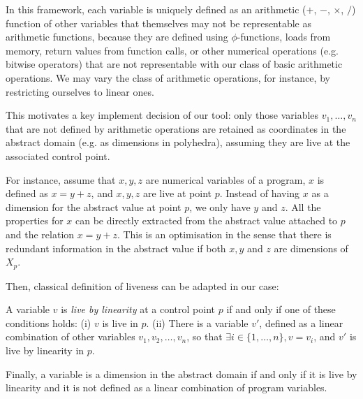 \documentclass{entcs}
\begin{document}
In this framework, each variable is uniquely defined as an arithmetic ($+$, $-$, $\times$, $/$) function of other variables that themselves may not be representable as arithmetic functions, because they are defined using $\phi$-functions, loads from memory, return values from function calls, or other numerical operations (e.g. bitwise operators) that are not representable with our class of basic arithmetic operations. We may vary the class of arithmetic operations, for instance, by restricting ourselves to linear ones.

This motivates a key implement decision of our tool: only those variables
$v_1,\dots,v_n$ that are not defined by arithmetic operations are retained as
coordinates in the abstract domain (e.g. as dimensions in polyhedra), assuming
they are live at the associated control point. 

	For instance, assume that $x,y,z$ are numerical variables of a program,
	$x$ is defined as $x = y+z$, and $x,y,z$ are live at point $p$. Instead of having
	$x$ as a dimension for the abstract value at point $p$, we only have $y$ and $z$. All the properties
	for $x$ can be directly extracted from the abstract value attached to $p$ and the relation $x=y+z$.
	This is an optimisation in the sense that there is redundant information in
	the abstract value if both $x,y$ and $z$ are dimensions of $X_p$.

	Then, classical definition of liveness can be adapted in our case:

	\begin{definition}
	A variable $v$ is \emph{live by linearity} at a control point $p$ if and
	only if one of these conditions holds:
		(i) $v$ is live in $p$.
        (ii) There is a variable $v'$, defined as a linear combination of other
		variables $v_1, v_2, \dots, v_n$, so that $\exists i \in \{1,\dots,n\}, v = v_i$,
		and $v'$ is live by linearity in $p$.
	\end{definition}

	Finally, a variable is a dimension in the abstract domain if and only if it
	is live by linearity and it is not defined as a linear combination of
	program variables.
\end{document}
